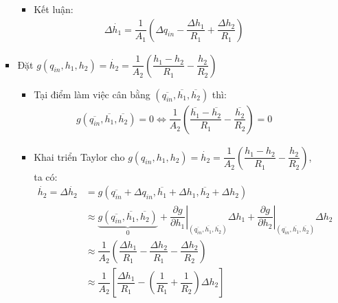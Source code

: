 \begin{enumerate}[\it a.]
\begin{itemize}
\begin{itemize}
\begin{itemize}
                                \item Kết luận:
                                    \begin{align}
                                        \Delta \dot{h_1} = \dfrac{1}{A_1} \left({\Delta q_{in} - \dfrac{\Delta h_1}{R_1} + \dfrac{\Delta h_2}{R_1}}\right)
                                    \end{align}
                            \end{itemize}

                        \item Đặt $g\left({q_{in}, h_1, h_2}\right) = \dot{h_2} = \dfrac{1}{A_2} \left({\dfrac{h_1 - h_2}{R_1} - \dfrac{h_2}{R_2}}\right)$
                            \begin{itemize}
                                \item Tại điểm làm việc cân bằng $\left({\overline{q_{in}}, \overline{h_1}, \overline{h_2}}\right)$ thì:
                                    \begin{align}
                                        g\left({\overline{q_{in}}, \overline{h_1}, \overline{h_2}}\right) = 0 \Longleftrightarrow \dfrac{1}{A_2} \left({\dfrac{\overline{h_1} - \overline{h_2}}{R_1} - \dfrac{\overline{h_2}}{R_2}}\right) = 0
                                    \end{align}

                                \item Khai triển Taylor cho $g\left({q_{in}, h_1, h_2}\right) = \dot{h_2} = \dfrac{1}{A_2} \left({\dfrac{h_1 - h_2}{R_1} - \dfrac{h_2}{R_2}}\right)$, ta có:
                                    \begin{align}
                                        \dot{h_2} = \Delta \dot{h_2} & = g\left({\overline{q_{in}} + \Delta q_{in}, \overline{h_1} + \Delta h_1, \overline{h_2} + \Delta h_2}\right) \\
                                        & \approx \underbrace{g\left({\overline{q_{in}}, \overline{h_1}, \overline{h_2}}\right)}_{0} + \left.\dfrac{\partial g}{\partial h_1}\right|_{\left({\overline{q_{in}}, \overline{h_1}, \overline{h_2}}\right)} \Delta h_1 + \left.\dfrac{\partial g}{\partial h_2}\right|_{\left({\overline{q_{in}}, \overline{h_1}, \overline{h_2}}\right)} \Delta h_2\\
                                        & \approx \dfrac{1}{A_2} \left({\dfrac{\Delta h_1}{R_1} - \dfrac{\Delta h_2}{R_1} - \dfrac{\Delta h_2}{R_2}}\right)\\
                                        & \approx \dfrac{1}{A_2} \left[{\dfrac{\Delta h_1}{R_1} - \left({\dfrac{1}{R_1} + \dfrac{1}{R_2}}\right) \Delta h_2}\right]
                                    \end{align}


\end{itemize}
\end{itemize}
\end{itemize}
\end{enumerate}
